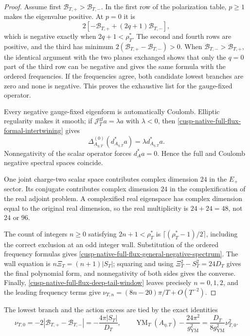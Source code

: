 \begin{proof}
Assume first \(\mathcal B_{T,+}>\mathcal B_{T,-}\).  In the first row of
the polarization table, \(p\ge1\) makes the eigenvalue positive.  At \(p=0\)
it is
\[
 2[-\mathcal B_{T,+}+(2q+1)\mathcal B_{T,-}],
\]
which is negative exactly when \(2q+1<\rho_T^*\).  The second and fourth
rows are positive, and the third has minimum
\(2(\mathcal B_{T,+}-\mathcal B_{T,-})>0\).  When
\(\mathcal B_{T,-}>\mathcal B_{T,+}\), the identical argument with the two
planes exchanged shows that only the \(q=0\) part of the third row can be
negative and gives the same formula with the ordered frequencies.  If the
frequencies agree, both candidate lowest branches are zero and none is
negative.  This proves the exhaustive list for the gauge-fixed operator.

Every negative gauge-fixed eigenform is automatically Coulomb.  Elliptic
regularity makes it smooth; if
\(\mathcal J_T^{\mathrm{gf}}a=\lambda a\) with \(\lambda<0\), then
\cref{cusp-native-full-flux-formal-intertwining} gives
\[
 \Delta_{A_{\eta,T}}^{(0)}(d_{A_{\eta,T}}^*a)
 =\lambda d_{A_{\eta,T}}^*a.
\]
Nonnegativity of the scalar operator forces \(d_A^*a=0\).  Hence the full and
Coulomb negative spectral spaces coincide.

One joint charge-two scalar space contributes complex dimension \(24\) in
the \(E_+\) sector.  Its conjugate contributes complex dimension \(24\) in
the complexification of the real adjoint problem.  A complexified real
eigenspace has complex dimension equal to the original real dimension, so
the real multiplicity is \(24+24=48\), not \(24\) or \(96\).

The count of integers \(n\ge0\) satisfying \(2n+1<\rho_T^*\) is
\(\lceil(\rho_T^*-1)/2\rceil\), including the correct exclusion at an odd
integer wall.  Substitution of the ordered frequency formulas gives
\cref{cusp-native-full-flux-general-negative-spectrum}.  The wall equation
is
\(n\Xi_T=(n+1)|S_T|\); squaring and using
\(\Xi_T^2-S_T^2=24D_T\) gives the final polynomial form, and nonnegativity of
both sides gives the converse.  Finally,
\cref{cusp-native-full-flux-deep-tail-window} leaves precisely
\(n=0,1,2\), and the leading frequency terms give
\(\nu_{T,n}=(8n-20)\pi/T+O(T^{-2})\).
\end{proof}

The lowest branch and the action excess are tied by the exact identities
\begin{equation}
 \nu_{T,0}=-2|\mathcal B_{T,+}-\mathcal B_{T,-}|
 =-\frac{4\pi|S_T|}{D_T},
 \qquad
 \operatorname{YM}_T(A_{\eta,T})-\frac{24\pi^2}{g_{\mathrm{YM}}^2}
 =\frac{D_T}{8g_{\mathrm{YM}}^2}\nu_{T,0}^2.
 \label{cusp-native-full-flux-action-instability}
\end{equation}
